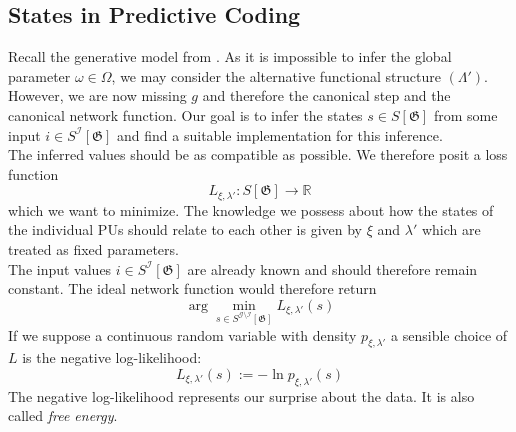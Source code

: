 \documentclass[a4paper,11pt]{report}
\begin{document}
\subsection{States in Predictive Coding}\label{subsec:theory-states-predicode}

\begin{Par}
Recall the generative model from . As it is impossible to infer the global parameter $\omega\in\Omega$, we may consider the alternative functional structure $(\Lambda')$. However, we are now missing $g$ and therefore the canonical step and the canonical network function. Our goal is to infer the states $s\in S[\mathfrak{G}]$ from some input $i\in S^{\mathcal{I}}[\mathfrak{G}]$ and find a suitable implementation for this inference.\\
The inferred values should be as compatible as possible. We therefore posit a loss function
\begin{equation}
L_{\xi,\lambda'}:S[\mathfrak{G}]\to\mathbb{R}
\end{equation}
which we want to minimize. The knowledge we possess about how the states of the individual PUs should relate to each other is given by $\xi$ and $\lambda'$ which are treated as fixed parameters.\\
The input values $i\in S^{\mathcal{I}}[\mathfrak{G}]$ are already known and should therefore remain constant. The ideal network function would therefore return
\begin{equation}
\arg\min_{s\in S^{\mathcal{G}\setminus\mathcal{I}}[\mathfrak{G}]}L_{\xi,\lambda'}(s)
\end{equation}
If we suppose a continuous random variable with density $p_{\xi,\lambda'}$ a sensible choice of $L$ is the negative log-likelihood:
\begin{equation}
L_{\xi,\lambda'}(s):=-\ln p_{\xi,\lambda'}(s)
\end{equation}
The negative log-likelihood represents our surprise about the data. It is also called \emph{free energy}.
\end{Par}
\end{document}
